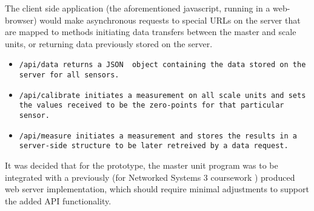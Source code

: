 The client side application (the aforementioned javascript, running in a web-browser) would make asynchronous requests to special URLs on the server that are mapped to methods initiating data transfers between the master and scale units, or returning data previously stored on the server.

\begin{itemize}
	\item \tt{/api/data} returns a JSON \cite{json-spec} object containing the data stored on the server for all sensors.
	\item \tt{/api/calibrate} initiates a measurement on all scale units and sets the values received to be the zero-points for that particular sensor.
	\item \tt{/api/measure} initiates a measurement and stores the results in a server-side structure to be later retreived by a \tt{data} request.
\end{itemize}

It was decided that for the prototype, the master unit program was to be integrated with a previously (for Networked Systems 3 coursework \cite{ns3-webserver}) produced web server implementation, which should require minimal adjustments to support the added API functionality.
